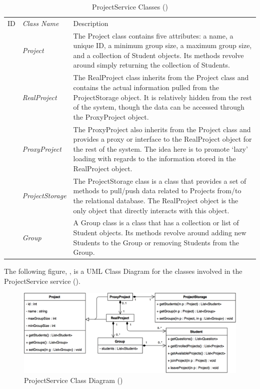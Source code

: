 \documentclass[12pt,letterpaper]{article}
\begin{document}
\begin{table}[H]
	\caption{ProjectService Classes ()} 
	\begin{tabu} to 
	    \tableheader{}ID & Class Name & Description \\
		 & Project & The Project class contains five attributes: a name, a unique ID, a minimum group size, a maximum group size, and a collection of Student objects. Its methods revolve around simply returning the collection of Students.\\
		 & RealProject & The RealProject class inherits from the Project class and contains the actual information pulled from the ProjectStorage object. It is relatively hidden from the rest of the system, though the data can be accessed through the ProxyProject object.\\
		 & ProxyProject & The ProxyProject also inherits from the Project class and provides a proxy or interface to the RealProject object for the rest of the system. The idea here is to promote `lazy' loading with regards to the information stored in the RealProject object.\\
		 & ProjectStorage & The ProjectStorage class is a class that provides a set of methods to pull/push data related to Projects from/to the relational database. The RealProject object is the only object that directly interacts with this object.\\
		 & Group & A Group class is a class that has a collection or list of Student objects. Its methods revolve around adding new Students to the Group or removing Students from the Group.\\
	\end{tabu}
\end{table}

The following figure, , is a UML Class Diagram for the classes involved in the ProjectService service ().

\begin{figure}[H]
	\centering{}
	\includegraphics[scale=0.33]{imgs/d3/interfaces/project.png}
	\caption{ProjectService Class Diagram ()}
\end{figure}
\end{document}
